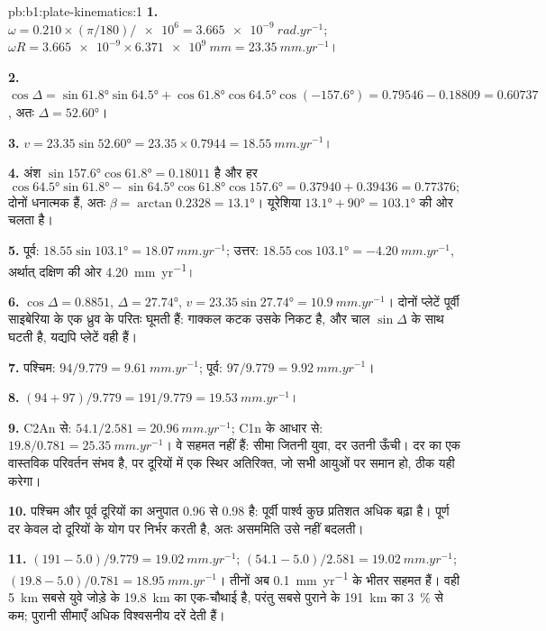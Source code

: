 \begin{solution}{pb:b1:plate-kinematics:1}
\textbf{1.} $\omega = 0.210\times(\pi/180)/\num{e6} = \qty{3.665e-9}{rad.yr^{-1}}$;
$\omega R = \num{3.665e-9}\times\qty{6.371e9}{mm} = \qty{23.35}{mm.yr^{-1}}$।

\textbf{2.} $\cos\Delta = \sin\ang{61.8}\sin\ang{64.5} + \cos\ang{61.8}
\cos\ang{64.5}\cos(\ang{-157.6}) = 0.79546 - 0.18809 = 0.60737$, अतः
$\Delta = \ang{52.60}$।

\textbf{3.} $v = 23.35\sin\ang{52.60} = 23.35\times0.7944 =
\qty{18.55}{mm.yr^{-1}}$।

\textbf{4.} अंश $\sin\ang{157.6}\cos\ang{61.8} = 0.18011$ है और हर
\[
  \cos\ang{64.5}\sin\ang{61.8} - \sin\ang{64.5}\cos\ang{61.8}\cos\ang{157.6} =
  0.37940 + 0.39436 = 0.77376;
\]
दोनों धनात्मक हैं, अतः $\beta = \arctan 0.2328 =
\ang{13.1}$। यूरेशिया $\ang{13.1} + \ang{90} = \ang{103.1}$ की ओर चलता है।

\textbf{5.} पूर्व: $18.55\sin\ang{103.1} = \qty{18.07}{mm.yr^{-1}}$; उत्तर:
$18.55\cos\ang{103.1} = \qty{-4.20}{mm.yr^{-1}}$, अर्थात् दक्षिण की ओर \qty{4.20}{mm.yr^{-1}}।

\textbf{6.} $\cos\Delta = 0.8851$, $\Delta = \ang{27.74}$, $v = 23.35
\sin\ang{27.74} = \qty{10.9}{mm.yr^{-1}}$। दोनों प्लेटें पूर्वी साइबेरिया के एक ध्रुव के परितः घूमती हैं: गाक्कल कटक उसके निकट है, और चाल $\sin\Delta$ के साथ घटती है, यद्यपि प्लेटें वही हैं।

\textbf{7.} पश्चिम: $94/9.779 = \qty{9.61}{mm.yr^{-1}}$; पूर्व: $97/9.779 =
\qty{9.92}{mm.yr^{-1}}$।

\textbf{8.} $(94 + 97)/9.779 = 191/9.779 = \qty{19.53}{mm.yr^{-1}}$।

\textbf{9.} C2An से: $54.1/2.581 = \qty{20.96}{mm.yr^{-1}}$; C1n के आधार से:
$19.8/0.781 = \qty{25.35}{mm.yr^{-1}}$। वे सहमत नहीं हैं: सीमा जितनी युवा, दर उतनी ऊँची। दर का एक वास्तविक परिवर्तन संभव है, पर दूरियों में एक स्थिर अतिरिक्त, जो सभी आयुओं पर समान हो, ठीक यही करेगा।

\textbf{10.} पश्चिम और पूर्व दूरियों का अनुपात 0.96 से 0.98 है: पूर्वी पार्श्व कुछ प्रतिशत अधिक बढ़ा है। पूर्ण दर केवल दो दूरियों के योग पर निर्भर करती है, अतः असममिति उसे नहीं बदलती।

\textbf{11.} $(191 - 5.0)/9.779 = \qty{19.02}{mm.yr^{-1}}$;
$(54.1 - 5.0)/2.581 = \qty{19.02}{mm.yr^{-1}}$; $(19.8 - 5.0)/0.781 =
\qty{18.95}{mm.yr^{-1}}$। तीनों अब \qty{0.1}{mm.yr^{-1}} के भीतर सहमत हैं। वही \qty{5}{km} सबसे युवे जोड़े के \qty{19.8}{km} का एक-चौथाई है, परंतु सबसे पुराने के \qty{191}{km} का \qty{3}{\percent} से कम; पुरानी सीमाएँ अधिक विश्वसनीय दरें देती हैं।


\end{solution}
